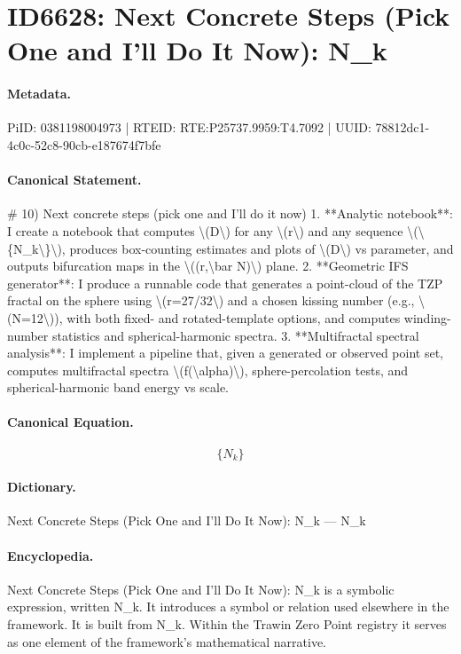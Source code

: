 \section*{ID6628: Next Concrete Steps (Pick One and I’ll Do It Now): N\_k}
\paragraph{Metadata.}
PiID: 0381198004973 | RTEID: RTE:P25737.9959:T4.7092 | UUID: 78812dc1-4c0c-52c8-90cb-e187674f7bfe

\paragraph{Canonical Statement.}
\# 10) Next concrete steps (pick one and I’ll do it now) 1. **Analytic notebook**: I create a notebook that computes \textbackslash{}(D\textbackslash{}) for any \textbackslash{}(r\textbackslash{}) and any sequence \textbackslash{}(\textbackslash{}\{N\_k\textbackslash{}\}\textbackslash{}), produces box-counting estimates and plots of \textbackslash{}(D\textbackslash{}) vs parameter, and outputs bifurcation maps in the \textbackslash{}((r,\textbackslash{}bar N)\textbackslash{}) plane. 2. **Geometric IFS generator**: I produce a runnable code that generates a point-cloud of the TZP fractal on the sphere using \textbackslash{}(r=27/32\textbackslash{}) and a chosen kissing number (e.g., \textbackslash{}(N=12\textbackslash{})), with both fixed- and rotated-template options, and computes winding-number statistics and spherical-harmonic spectra. 3. **Multifractal spectral analysis**: I implement a pipeline that, given a generated or observed point set, computes multifractal spectra \textbackslash{}(f(\textbackslash{}alpha)\textbackslash{}), sphere-percolation tests, and spherical-harmonic band energy vs scale.

\paragraph{Canonical Equation.}
\[
\{N_k\}
\]

\paragraph{Dictionary.}
Next Concrete Steps (Pick One and I’ll Do It Now): N\_k — N\_k

\paragraph{Encyclopedia.}
Next Concrete Steps (Pick One and I’ll Do It Now): N\_k is a symbolic expression, written N\_k. It introduces a symbol or relation used elsewhere in the framework. It is built from N\_k. Within the Trawin Zero Point registry it serves as one element of the framework's mathematical narrative.

